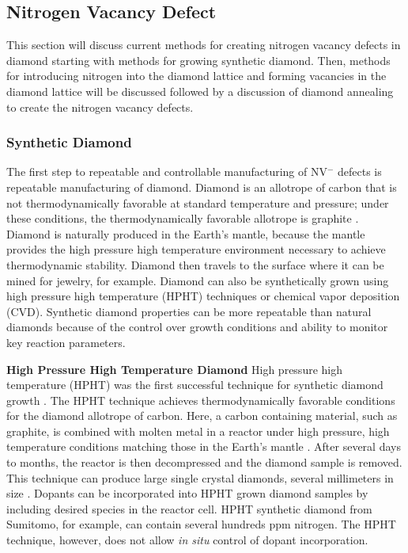 \subsection{Nitrogen Vacancy Defect}
\label{NVFab}
\indent 
This section will discuss current methods for creating nitrogen vacancy defects in diamond starting with methods for growing synthetic diamond. Then, methods for introducing nitrogen into the diamond lattice and forming vacancies in the diamond lattice will be discussed followed by a discussion of diamond annealing to create the nitrogen vacancy defects.

\subsubsection{Synthetic Diamond}
\label{syntheicDiamond}
\indent
    
    The first step to repeatable and controllable manufacturing of NV$^-$ defects is repeatable manufacturing of diamond. Diamond is an allotrope of carbon that is not thermodynamically favorable at standard temperature and pressure; under these conditions, the thermodynamically favorable allotrope is graphite \cite{PaulM2000}. Diamond is naturally produced in the Earth’s mantle, because the mantle provides the high pressure high temperature environment necessary to achieve thermodynamic stability. Diamond then travels to the surface where it can be mined for jewelry, for example. Diamond can also be synthetically grown using high pressure high temperature (HPHT) techniques or chemical vapor deposition (CVD). Synthetic diamond properties can be more repeatable than natural diamonds because of the control over growth conditions and ability to monitor key reaction parameters. 

    \noindent\textbf{High Pressure High Temperature Diamond}
    \newline\indent
     High pressure high temperature (HPHT) was the first successful technique for synthetic diamond growth \cite{Bundy1955Man-MadeDiamonds}. The HPHT technique achieves thermodynamically favorable conditions for the diamond allotrope of carbon. Here, a carbon containing material, such as graphite, is combined with molten metal in a reactor under high pressure, high temperature conditions matching those in the Earth’s mantle \cite{Bovenkerk1993}. After several days to months, the reactor is then decompressed and the diamond sample is removed. This technique can produce large single crystal diamonds, several millimeters in size \cite{Sumiya1996High-pressureCrystal}. Dopants can be incorporated into HPHT grown diamond samples by including desired species in the reactor cell. HPHT synthetic diamond from Sumitomo, for example, can contain several hundreds ppm nitrogen. The HPHT technique, however, does not allow \textit{in situ} control of dopant incorporation.

